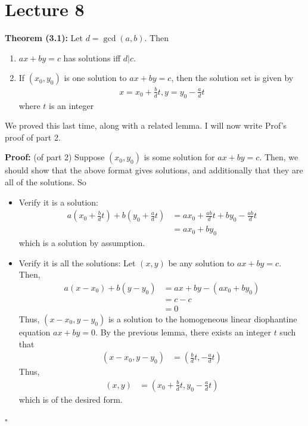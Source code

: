 \documentclass{article}
\newcommand*{\qed}{\hfill$\square$}%
\begin{document}
\section{Lecture 8}

\textbf{Theorem (3.1):} Let $d=\gcd(a,b)$. Then \begin{enumerate}
    \item $ax+by=c$ has solutions iff $d|c$. 
    \item If $(x_0,y_0)$ is one solution to $ax+by=c$, then the solution set is given by \begin{align*}
        x=x_0+\frac{b}{d}t, y=y_0-\frac{a}{d}t
    \end{align*}where $t$ is an integer
\end{enumerate}

We proved this last time, along with a related lemma. I will now write Prof's proof of part 2.

\textbf{Proof:} (of part 2) Suppose $(x_0,y_0)$ is some solution for $ax+by=c$. Then, we should show that the above format gives solutions, and additionally that they are all of the solutions. So \begin{itemize}
    \item Verify it is a solution: \begin{align*}
        a(x_0+\frac{b}{d}t)+b(y_0+\frac{a}{d}t)&=ax_0+\frac{ab}{d}t+by_0-\frac{ab}{d}t \\
        &= ax_0+by_0 
    \end{align*}
    which is a solution by assumption. 
    \item Verify it is all the solutions: Let $(x,y)$ be any solution to $ax+by=c$. Then, \begin{align*}
        a(x-x_0)+b(y-y_0) &= ax+by - (ax_0+by_0) \\
        &= c-c \\
        &= 0
    \end{align*}
    Thus, $(x-x_0,y-y_0)$ is a solution to the homogeneous linear diophantine equation $ax+by=0$. By the previous lemma, there exists an integer $t$ such that \begin{align*}
        (x-x_0,y-y_0) &= (\frac{b}{d}t, -\frac{a}{d}t)
    \end{align*}
    Thus, \begin{align*}
        (x,y) &= (x_0+\frac{b}{d}t, y_0-\frac{a}{d}t)
    \end{align*}
    which is of the desired form.
\end{itemize}\qed 
\end{document}

